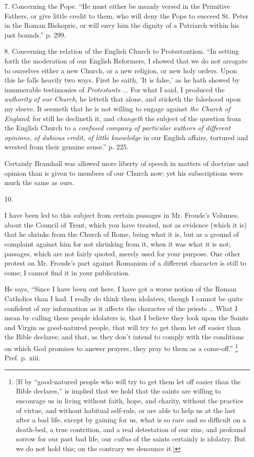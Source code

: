 7. Concerning the Pope. ``He must either be
meanly versed in the Primitive Fathers, or give little credit to them,
who will deny the Pope to succeed St. Peter in the Roman Bishopric, or
will envy him the dignity of a Patriarch within his just bounds.'' p.
299.

8. Concerning the relation of the English Church
to Protestantism. ``In setting forth the moderation of our English
Reformers, I showed that we do not arrogate to ourselves either a new
Church, or a new religion, or new holy orders. Upon this he falls
heavily two ways. First he saith, 'It is false,' as he hath showed by
innumerable testimonies of \emph{Protestants} ... For what I said, I
produced the \emph{authority of our Church}, he letteth that alone,
and sticketh the falsehood upon my sleeve. It seemeth that he is
not willing to engage against \emph{the Church of England}; for still
he declineth it, and \emph{changeth} the subject of the question from
the English Church to a \emph{confused company of particular authors of
different opinions, of dubious credit, of little knowledge} in our
English affairs, tortured and wrested from their genuine sense.'' p.
225.

Certainly Bramhall was allowed more liberty of
speech in matters of doctrine and opinion than is given to members of
our Church now; yet his subscriptions were much the same as ours.

10.

I have been led to this subject from certain
passages in Mr. Froude's Volumes, about the Council of Trent, which
you have treated, not as evidence (which it is) that he shrinks from
the Church of Rome, being what it is, but as a ground of complaint
against him for not shrinking from it, when it was what it is not;
passages, which are not fairly quoted, merely used for your purpose.
One other protest on Mr. Froude's part against Romanism of a
different character is still to come; I cannot find it in your
publication.

He says, ``Since I have been out here, I have
got a worse notion of the Roman Catholics than I had. I really do
think them idolaters, though I cannot be quite confident of my
information as it affects the character of the priests … What I mean
by calling these people idolaters is, that I believe they look upon
the Saints and Virgin as good-natured people, that will try to get
them let off easier than the Bible declares; and that, as they don't
intend to comply with the conditions on which God promises to answer
prayers, they pray to them as a come-off.'' \footnote{[If by ``good-natured people who will try to get them let off
easier than the Bible declares,'' is implied that we hold that the
saints are willing to encourage us in living without faith, hope, and
charity, without the practice of virtue, and without habitual
self-rule, or are able to help us at the last after a bad life, except
by gaining for us, what is so rare and so difficult on a death-bed, a
true contrition, and a real detestation of our sins, and profound
sorrow for our past bad life, our \emph{cultus} of the saints
certainly is idolatry. But we do not hold this; on the contrary we
denounce it.]} Pref. p. xiii.

